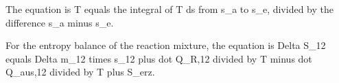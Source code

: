The equation is T equals the integral of T ds from s_a to s_e, divided by the difference s_a minus s_e.

For the entropy balance of the reaction mixture, the equation is Delta S_12 equals Delta m_12 times s_12 plus dot Q_R,12 divided by T minus dot Q_aus,12 divided by T plus S_erz.